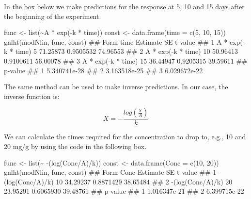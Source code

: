 \documentclass[a4paper,12pt,oneside]{book}
\newenvironment{Shaded}{\begin{snugshade}}{\end{snugshade}}
\newcommand{\DecValTok}[1]{#1}
\newcommand{\SpecialCharTok}[1]{#1}
\newcommand{\DocumentationTok}[1]{#1}
\newcommand{\OtherTok}[1]{#1}
\newcommand{\FunctionTok}[1]{#1}
\newcommand{\AttributeTok}[1]{#1}
\newcommand{\NormalTok}[1]{#1}
\begin{document}
In the box below we make predictions for the response at 5, 10 and 15 days after the beginning of the experiment.

\vspace{12pt}

\begin{Shaded}
\begin{Highlighting}[]
\NormalTok{func }\OtherTok{\textless{}{-}} \FunctionTok{list}\NormalTok{(}\SpecialCharTok{\textasciitilde{}}\NormalTok{A }\SpecialCharTok{*} \FunctionTok{exp}\NormalTok{(}\SpecialCharTok{{-}}\NormalTok{k }\SpecialCharTok{*}\NormalTok{ time))}
\NormalTok{const }\OtherTok{\textless{}{-}} \FunctionTok{data.frame}\NormalTok{(}\AttributeTok{time =} \FunctionTok{c}\NormalTok{(}\DecValTok{5}\NormalTok{, }\DecValTok{10}\NormalTok{, }\DecValTok{15}\NormalTok{)) }
\FunctionTok{gnlht}\NormalTok{(modNlin, func,  const)}
\DocumentationTok{\#\#                 Form time Estimate        SE  t{-}value}
\DocumentationTok{\#\# 1 A * exp({-}k * time)    5 71.25873 0.9505532 74.96553}
\DocumentationTok{\#\# 2 A * exp({-}k * time)   10 50.96413 0.9100611 56.00078}
\DocumentationTok{\#\# 3 A * exp({-}k * time)   15 36.44947 0.9205315 39.59611}
\DocumentationTok{\#\#        p{-}value}
\DocumentationTok{\#\# 1 5.340741e{-}28}
\DocumentationTok{\#\# 2 3.163518e{-}25}
\DocumentationTok{\#\# 3 6.029672e{-}22}
\end{Highlighting}
\end{Shaded}

The same method can be used to make inverse predictions. In our case, the inverse function is:

\[X = - \frac{log \left( \frac{Y}{A} \right)}{k}\]

We can calculate the times required for the concentration to drop to, e.g., 10 and 20 mg/g by using the code in the following box.

\vspace{12pt}

\begin{Shaded}
\begin{Highlighting}[]
\NormalTok{func }\OtherTok{\textless{}{-}} \FunctionTok{list}\NormalTok{(}\SpecialCharTok{\textasciitilde{}} \SpecialCharTok{{-}}\NormalTok{(}\FunctionTok{log}\NormalTok{(Conc}\SpecialCharTok{/}\NormalTok{A)}\SpecialCharTok{/}\NormalTok{k))}
\NormalTok{const }\OtherTok{\textless{}{-}} \FunctionTok{data.frame}\NormalTok{(}\AttributeTok{Conc =} \FunctionTok{c}\NormalTok{(}\DecValTok{10}\NormalTok{, }\DecValTok{20}\NormalTok{)) }
\FunctionTok{gnlht}\NormalTok{(modNlin, func,  const)}
\DocumentationTok{\#\#               Form Conc Estimate        SE  t{-}value}
\DocumentationTok{\#\# 1 {-}(log(Conc/A)/k)   10 34.29237 0.8871429 38.65484}
\DocumentationTok{\#\# 2 {-}(log(Conc/A)/k)   20 23.95291 0.6065930 39.48761}
\DocumentationTok{\#\#        p{-}value}
\DocumentationTok{\#\# 1 1.016347e{-}21}
\DocumentationTok{\#\# 2 6.399715e{-}22}
\end{Highlighting}
\end{Shaded}
\end{document}
